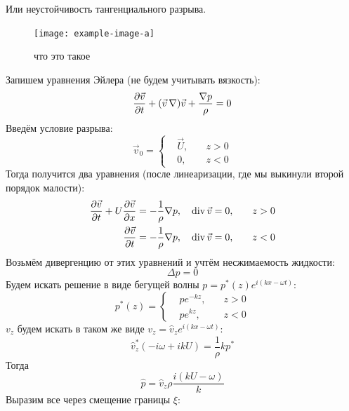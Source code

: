 Или неустойчивость тангенциального разрыва.
\begin{figure}[H]
    \centering
    \texttt{[image: example-image-a]}
    \caption{что это такое}
    \label{fig:kelv-gelm}
\end{figure}
Запишем уравнения Эйлера (не будем учитывать вязкость):
\begin{equation}
    \pdv{\vec{v}}{t}+ (\vec{v}\,\nabla) \vec{v} + 
        \frac{\nabla p}{\rho}=0
\end{equation}
Введём условие разрыва:
\begin{equation}
    \vec{v}_0 = \left\{
    \begin{aligned}
        &\vec{U}, \quad &z>0 \\
        &0, \quad &z<0
    \end{aligned}\right.
\end{equation}
Тогда получится два уравнения (после линеаризации, 
где мы выкинули второй порядок малости):
\begin{gather}
    \begin{aligned}
     \pdv{\vec{v}}{t}+U\pdv{\vec{v}}{x} = -\frac{1}{\rho}\nabla p, 
     &\quad \operatorname{div} \vec{v} = 0, &\quad z>0\\
    \pdv{\vec{v}}{t} = -\frac{1}{\rho}\nabla p, 
                             &\quad \operatorname{div} \vec{v} = 0, &\quad z<0\\
    \end{aligned}
\end{gather}
Возьмём дивергенцию от этих уравнений и учтём несжимаемость жидкости:
\begin{equation}
    \Delta p = 0
\end{equation}
Будем искать решение в виде бегущей волны $p=p^*(z)e^{i(kx-\omega t)}$:
\begin{equation}
    p^*(z) = \left\{
    \begin{aligned}
        &p e^{-kz}, \quad &z>0\\        
        &p e^{kz}, \quad & z<0
    \end{aligned}
    \right.
\end{equation}
$v_z$ будем искать в таком же виде $v_z=\hat{v}_z e^{i(kx-\omega t)}$:
\begin{equation}
    \hat{v}_z^* (-i\omega +ikU) = \frac{1}{\rho}k p^*
\end{equation} 
Тогда
\begin{equation}
    \hat{p} = \hat{v}_z \rho \frac{i(kU-\omega)}{k}
\end{equation}
Выразим все через смещение границы $\xi$:
